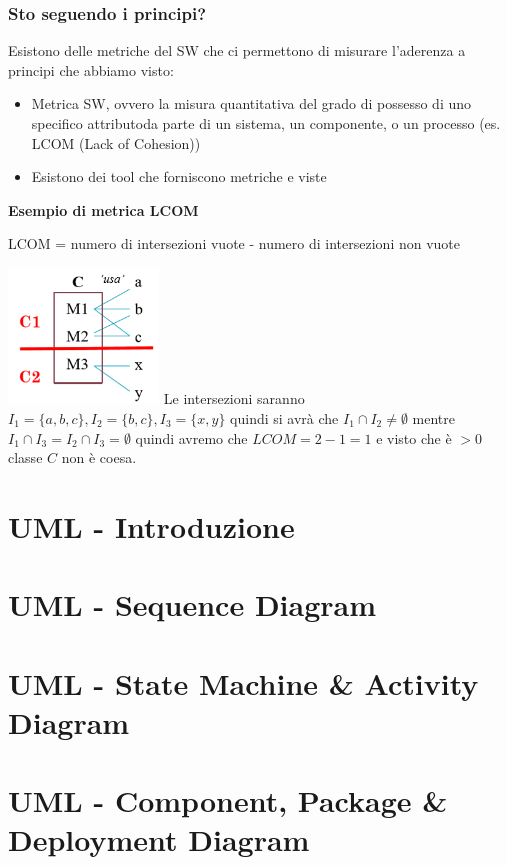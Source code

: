 \documentclass[12pt, a4paper]{report}
\begin{document}
\subsection{Sto seguendo i principi?}
Esistono delle metriche del SW che ci permettono di misurare l'aderenza a principi che abbiamo visto:
\begin{itemize}
    \item Metrica SW, ovvero la misura quantitativa del grado di possesso di uno specifico attributoda parte di un sistema, un componente, o un processo (es. LCOM (Lack of Cohesion))
    \item Esistono dei tool che forniscono  metriche e viste
\end{itemize}
\textbf{Esempio di metrica LCOM}
\begin{center}
    LCOM = numero di intersezioni vuote - numero di intersezioni non vuote
\end{center}
\includegraphics[width=0.3\textwidth]{Immagini/esempioLCOM.png}
Le intersezioni saranno $I_{1}=\{a,b,c\},I_{2}=\{b,c\},I_{3}=\{x,y\}$ quindi si avrà che $I_{1}\cap I_{2} \neq \emptyset $ mentre $I_{1}\cap I_{3} =I_{2}\cap I_{3} = \emptyset$ quindi avremo che $LCOM = 2-1 = 1$ e visto che è $>0$ classe $C$ non è coesa.
\chapter{UML - Introduzione}
\chapter{UML - Sequence Diagram}
\chapter{UML - State Machine \& Activity Diagram}
\chapter{UML - Component, Package \& Deployment Diagram}
\end{document}
